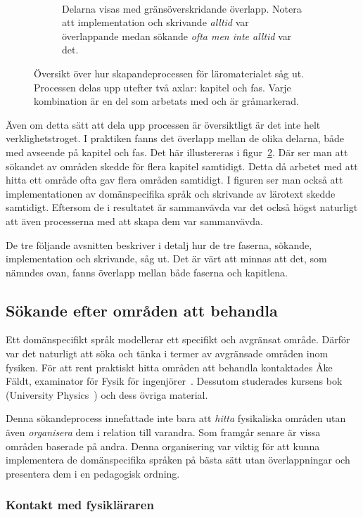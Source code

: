 \begin{figure}[tph]
\begin{subfigure}[t]{0.5\textwidth}
        \caption{Delarna visas med gränsöverskridande överlapp. Notera att
        implementation och skrivande \textit{alltid} var överlappande medan
      sökande \textit{ofta men inte alltid} var det.}~\label{fig:oversiktB}
    \end{subfigure}
    \caption{Översikt över hur skapandeprocessen för läromaterialet såg ut.
  Processen delas upp utefter två axlar: kapitel och fas. Varje kombination
  är en del som arbetats med och är gråmarkerad.} 
\end{figure}

Även om detta sätt att dela upp processen är översiktligt är det inte helt
verklighetstroget. I praktiken fanns det överlapp mellan de olika delarna, både
med avseende på kapitel och fas. Det här illustereras i
figur~\ref{fig:oversiktB}. Där ser man att sökandet av områden skedde för flera
kapitel samtidigt. Detta då arbetet med att hitta ett område ofta gav flera
områden samtidigt. I figuren ser man också att implementationen av domänspecifika
språk och skrivande av lärotext skedde samtidigt. Eftersom de i resultatet är
sammanvävda var det också högst naturligt att även processerna med att skapa dem var sammanvävda.

De tre följande avsnitten beskriver i detalj hur de tre faserna, sökande,
implementation och skrivande, såg ut. Det är värt att minnas att det, som
nämndes ovan, fanns överlapp mellan både faserna och kapitlena.

\subsection{Sökande efter områden att behandla}\label{sec:valet}

Ett domänspecifikt språk modellerar ett specifikt och avgränsat område. Därför
var det naturligt att söka och tänka i termer av avgränsade områden inom
fysiken. För att rent praktiskt hitta områden att behandla kontaktades Åke
Fäldt, examinator för Fysik för ingenjörer~\cite{tif085}. Dessutom studerades kursens bok (University
Physics~\cite{UP}) och dess övriga material.

Denna sökandeprocess innefattade inte bara att \textit{hitta} fysikaliska
områden utan även \textit{organisera} dem i relation till varandra. Som framgår
senare är vissa områden baserade på andra. Denna organisering
var viktig för att kunna implementera de domänspecifika språken på bästa sätt utan överlappningar och presentera dem i en pedagogisk ordning.

\subsubsection*{Kontakt med fysikläraren}
\label{sec:kontakt_faldt}

